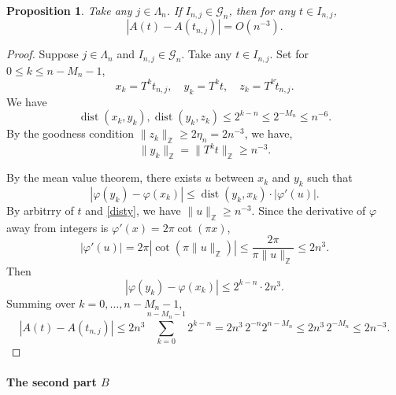 \documentclass{amsart}
\newtheorem{prop}[thm]{Proposition}
\theoremstyle{definition}
\newcommand{\dist}{\operatorname{dist}}
\newcommand{\norm}[1]{\|#1\|}
\begin{document}
\begin{prop}\label{prop:A_estimate}
Take any $j\in\Lambda_n$. If $I_{n,j}\in\mathcal G_n$, then for any $t\in I_{n,j}$, 
\[
|A(t)-A(t_{n,j})| = O(n^{-3}).
\]
\end{prop}
\begin{proof}
Suppose $j\in\Lambda_n$ and $I_{n,j}\in\mathcal G_n$.
Take any $t\in I_{n,j}$. Set for $0\le k\le n-M_n-1$,
$$x_k = T^k t_{n,j},\quad y_k = T^k t,\quad z_k = T^k \tilde{t}_{n,j}.$$
We have
$$\dist(x_k,y_k), \dist(y_k,z_k) \le 2^{k-n} \le 2^{-M_n}\le n^{-6}.$$
By the goodness condition $\norm{z_k}_{\mathbb{Z}}\ge 2\eta_n = 2n^{-3}$, 
we have,
\begin{equation}\label{disty}
\norm{y_k}_{\mathbb{Z}}=\norm{T^kt}_{\mathbb{Z}}\ge n^{-3}.
\end{equation}

By the mean value theorem, there exists $u$ between $x_k$ and $y_k$ such that
$$|\varphi(y_k)-\varphi(x_k)| \le \dist(y_k,x_k) \cdot |\varphi'(u)|.$$
By arbitrry of $t$ and \eqref{disty}, we have $\norm{u}_{\mathbb{Z}}\ge n^{-3}$. 
Since the derivative of $\varphi$ away from integers is $\varphi'(x)=2\pi\cot(\pi x)$,
$$|\varphi'(u)| = 2\pi|\cot(\pi\norm{u}_{\mathbb{Z}})| 
\le \frac{2\pi}{\pi\norm{u}_{\mathbb{Z}}} \le 2n^3.$$
Then 
$$|\varphi(y_k)-\varphi(x_k)| \le 2^{k-n}\cdot 2n^3.$$
Summing over $k=0,\dots,n-M_n-1$,
\[
|A(t)-A(t_{n,j})|
\le 2n^3\sum_{k=0}^{n-M_n-1} 2^{k-n}
= 2n^3\,2^{-n}2^{n-M_n}
\le 2n^3\,2^{-M_n}\le 2n^{-3}.
\]
\end{proof}

\paragraph{The second part $B$}
\end{document}
